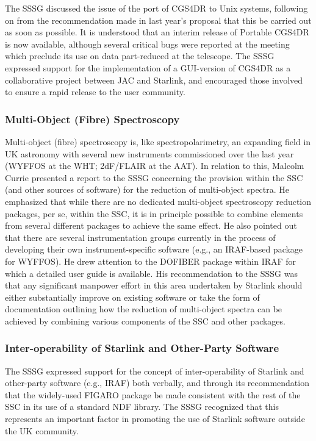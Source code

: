 The SSSG discussed the issue of the port of CGS4DR to Unix systems,
following on from the recommendation made in last year's proposal that
this be carried out as soon as possible.  It is understood that an
interim release of Portable CGS4DR is now available, although several
critical bugs were reported at the meeting which preclude its use on
data part-reduced at the telescope.  The SSSG expressed support for
the implementation of a GUI-version of CGS4DR as a collaborative
project between JAC and Starlink, and encouraged those involved to
ensure a rapid release to the user community.

\subsubsection{Multi-Object (Fibre) Spectroscopy}

Multi-object (fibre) spectroscopy is, like spectropolarimetry, an
expanding field in UK astronomy with several new instruments
commissioned over the last year (WYFFOS at the WHT; 2dF/FLAIR at the
AAT).  In relation to this, Malcolm Currie presented a report to the
SSSG concerning the provision within the SSC (and other sources of
software) for the reduction of multi-object spectra.  He emphasized
that while there are no dedicated multi-object spectroscopy reduction
packages, per se, within the SSC, it is in principle possible to
combine elements from several different packages to achieve the same
effect. He also pointed out that there are several instrumentation
groups currently in the process of developing their own
instrument-specific software (e.g., an IRAF-based package for WYFFOS).
He drew attention to the DOFIBER package within IRAF for which a
detailed user guide is available.  His recommendation to the SSSG was
that any significant manpower effort in this area undertaken by
Starlink should either substantially improve on existing software or
take the form of documentation outlining how the reduction of
multi-object spectra can be achieved by combining various components
of the SSC and other packages.

\subsubsection{\label{specSSG:IRAF}Inter-operability of Starlink and Other-Party Software}

The SSSG expressed support for the concept of inter-operability of
Starlink and other-party software (e.g., IRAF) both verbally, and
through its recommendation that the widely-used FIGARO package be made
consistent with the rest of the SSC in its use of a standard NDF
library.  The SSSG recognized that this represents an important factor
in promoting the use of Starlink software outside the UK community.

